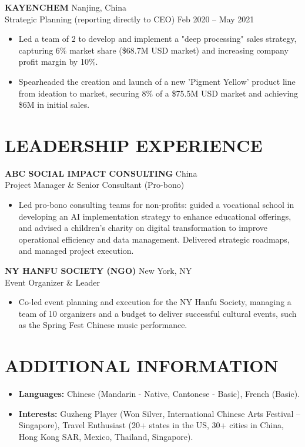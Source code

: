 \documentclass[9pt, letterpaper]{article}
\newenvironment{highlights}{
    \begin{itemize}[
        topsep=0.02cm,
        parsep=0.02cm,
        partopsep=0pt,
        itemsep=0pt,
        leftmargin=10pt
    ]
}{
    \end{itemize}
}
\begin{document}
    \vspace{0.1cm}

    \noindent\textbf{KAYENCHEM} \hfill Nanjing, China \\
    Strategic Planning (reporting directly to CEO) \hfill Feb 2020 – May 2021
    \begin{highlights}
        \item Led a team of 2 to develop and implement a "deep processing" sales strategy, capturing 6\% market share (\$68.7M USD market) and increasing company profit margin by 10\%.
        \item Spearheaded the creation and launch of a new 'Pigment Yellow' product line from ideation to market, securing 8\% of a \$75.5M USD market and achieving \$6M in initial sales.
    \end{highlights}

    \section{LEADERSHIP EXPERIENCE}
    \noindent\textbf{ABC SOCIAL IMPACT CONSULTING} \hfill China \\
    Project Manager \& Senior Consultant (Pro-bono)
    \begin{highlights}
        \item Led pro-bono consulting teams for non-profits: guided a vocational school in developing an AI implementation strategy to enhance educational offerings, and advised a children's charity on digital transformation to improve operational efficiency and data management. Delivered strategic roadmaps, and managed project execution.
    \end{highlights}

    \vspace{0.1cm}

    \noindent\textbf{NY HANFU SOCIETY (NGO)} \hfill New York, NY \\
    Event Organizer \& Leader
    \begin{highlights}
        \item Co-led event planning and execution for the NY Hanfu Society, managing a team of 10 organizers and a budget to deliver successful cultural events, such as the Spring Fest Chinese music performance.
    \end{highlights}

    \section{ADDITIONAL INFORMATION}
    \begin{highlights}
        \item \textbf{Languages:} Chinese (Mandarin - Native, Cantonese - Basic), French (Basic).
        \item \textbf{Interests:} Guzheng Player (Won Silver, International Chinese Arts Festival – Singapore), Travel Enthusiast (20+ states in the US, 30+ cities in China, Hong Kong SAR, Mexico, Thailand, Singapore).
    \end{highlights}
\end{document}
